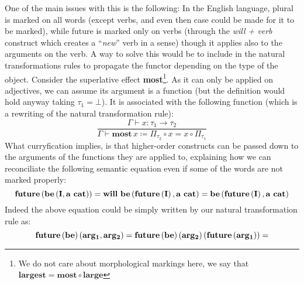 \documentclass[math, english, info]{cours}
\def\cont{\Gamma\vdash}
\begin{document}
One of the main issues with this is the following:
In the English language, plural is marked on all words (except verbs, and even then case could be made for it to be marked),
while future is marked only on verbs (through the \textit{will + verb} construct which creates a ``\emph{new}'' verb in a sense) though it applies also to the arguments on the verb.
A way to solve this would be to include in the natural transformations rules to propagate the functor depending on the type of the object.
Consider the superlative effect \textbf{most}\footnote{We do not care about morphological markings here, we say that $\mathbf{largest} = \mathbf{most} \circ \mathbf{large}$}.
As it can only be applied on adjectives, we can assume its argument is a function (but the definition would hold anyway taking $\tau_{1} = \bot$).
It is associated with the following function (which is a rewriting of the natural transformation rule):
\begin{equation*}
	\frac{\cont x: \tau_{1} \to \tau_{2}}{\cont \mathbf{most}\, x \coloneqq \Pi_{\tau_{2}} \circ x = x \circ \Pi_{\tau_{1}}}
\end{equation*}
What curryfication implies, is that higher-order constructs can be passed down to the arguments of the functions they are applied to, explaining how we can reconciliate the following semantic equation even if some of the words are not marked properly:
\begin{equation*}
	\bf future\left(be\left( I, a\ cat \right)\right) = will\ be\left( future\left( I \right), a\ cat \right) = be\left( future\left( I \right), a\ cat \right)
\end{equation*}
Indeed the above equation could be simply written by our natural transformation rule as:
\begin{equation*}
	\bf future\left( be \right)\left( arg_{1}, arg_{2} \right) = future\left( be \right)\left( arg_{2} \right)\left( future\left( arg_{1} \right) \right) =
\end{equation*}
\end{document}
